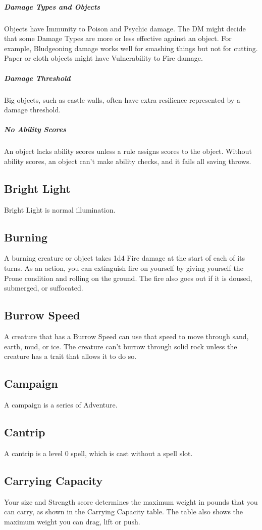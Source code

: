 \documentclass[10pt,a4paper,twoside,bg=print,twocolumn,openany,nodeprecatedcode]{dndarticle}
\begin{document}
\subparagraph{Damage Types and Objects}
Objects have Immunity to Poison and Psychic damage. The DM might decide that some Damage Types are more or less effective against an object. For example, Bludgeoning damage works well for smashing things but not for cutting. Paper or cloth objects might have Vulnerability to Fire damage.

\subparagraph{Damage Threshold}
Big objects, such as castle walls, often have extra resilience represented by a damage threshold.

\subparagraph{No Ability Scores}
An object lacks ability scores unless a rule assigns scores to the object. Without ability scores, an object can't make ability checks, and it fails all saving throws.

\subsection{Bright Light}
Bright Light is normal illumination.

\subsection{Burning}
A burning creature or object takes 1d4 Fire damage at the start of each of its turns. As an action, you can extinguish fire on yourself by giving yourself the Prone condition and rolling on the ground. The fire also goes out if it is doused, submerged, or suffocated.

\subsection{Burrow Speed}
A creature that has a Burrow Speed can use that speed to move through sand, earth, mud, or ice. The creature can't burrow through solid rock unless the creature has a trait that allows it to do so.

\subsection{Campaign}
A campaign is a series of Adventure.

\subsection{Cantrip}
A cantrip is a level 0 spell, which is cast without a spell slot.

\subsection{Carrying Capacity}
Your size and Strength score determines the maximum weight in pounds that you can carry, as shown in the Carrying Capacity table. The table also shows the maximum weight you can drag, lift or push.
\end{document}
